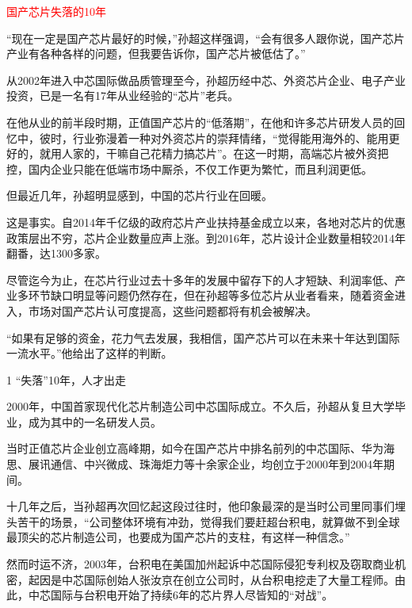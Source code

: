 \documentclass[utf8]{book}
\begin{document}
	\begin{center}
			{\LARGE \textcolor{red}{国产芯片失落的10年}}
	\end{center}
	
	“现在一定是国产芯片最好的时候，”孙超这样强调，“会有很多人跟你说，国产芯片产业有各种各样的问题，但我要告诉你，国产芯片被低估了。”
	
	从2002年进入中芯国际做品质管理至今，孙超历经中芯、外资芯片企业、电子产业投资，已是一名有17年从业经验的“芯片”老兵。
	
	在他从业的前半段时期，正值国产芯片的“低落期”，在他和许多芯片研发人员的回忆中，彼时，行业弥漫着一种对外资芯片的崇拜情绪，“觉得能用海外的、能用更好的，就用人家的，干嘛自己花精力搞芯片”。在这一时期，高端芯片被外资把控，国内企业只能在低端市场中厮杀，不仅工作更为繁忙，而且利润更低。
	
	但最近几年，孙超明显感到，中国的芯片行业在回暖。
	
	这是事实。自2014年千亿级的政府芯片产业扶持基金成立以来，各地对芯片的优惠政策层出不穷，芯片企业数量应声上涨。到2016年，芯片设计企业数量相较2014年翻番，达1300多家。
	
	尽管迄今为止，在芯片行业过去十多年的发展中留存下的人才短缺、利润率低、产业多环节缺口明显等问题仍然存在，但在孙超等多位芯片从业者看来，随着资金进入，市场对国产芯片认可度提高，这些问题都将有机会被解决。
	
	“如果有足够的资金，花力气去发展，我相信，国产芯片可以在未来十年达到国际一流水平。”他给出了这样的判断。
	
	\begin{flushleft}
		{\Large 1 “失落”10年，人才出走}
	\end{flushleft}
	
	
	
	2000年，中国首家现代化芯片制造公司中芯国际成立。不久后，孙超从复旦大学毕业，成为其中的一名研发人员。
	
	当时正值芯片企业创立高峰期，如今在国产芯片中排名前列的中芯国际、华为海思、展讯通信、中兴微成、珠海炬力等十余家企业，均创立于2000年到2004年期间。
	
	十几年之后，当孙超再次回忆起这段过往时，他印象最深的是当时公司里同事们埋头苦干的场景，“公司整体环境有冲劲，觉得我们要赶超台积电，就算做不到全球最顶尖的芯片制造公司，也要成为国产芯片的支柱，有这样一种信念。”
	
	然而时运不济，2003年，台积电在美国加州起诉中芯国际侵犯专利权及窃取商业机密，起因是中芯国际创始人张汝京在创立公司时，从台积电挖走了大量工程师。由此，中芯国际与台积电开始了持续6年的芯片界人尽皆知的“对战”。
	
\end{document}
